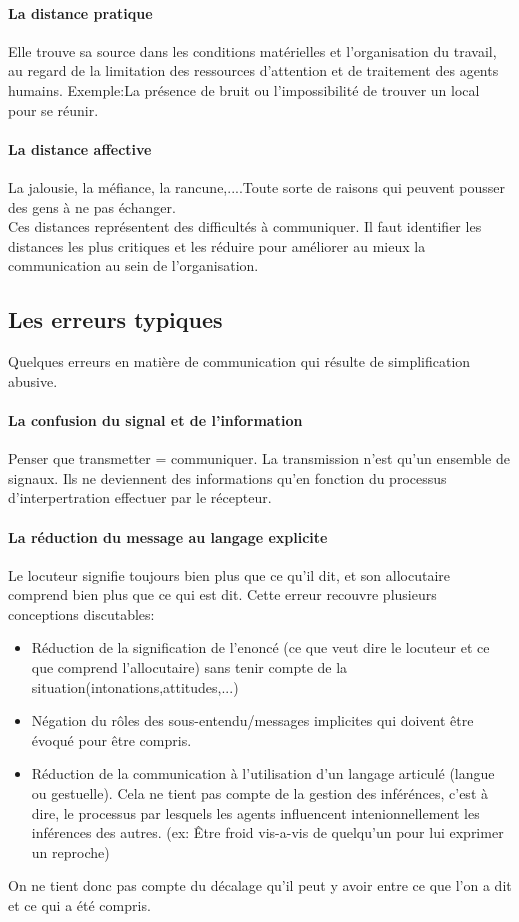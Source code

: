 \documentclass[11pt]{article} %
\begin{document}
		\paragraph{La distance pratique} Elle trouve sa source dans les conditions matérielles et l'organisation
		du travail, au regard de la limitation des ressources d'attention et de traitement des agents humains. 
		Exemple:La présence de bruit ou l'impossibilité de trouver un local pour se réunir.
		\paragraph{La distance affective} La jalousie, la méfiance, la rancune,....Toute sorte de raisons qui 
		peuvent pousser des gens à ne pas échanger.\\
		Ces distances représentent des difficultés à communiquer. Il faut identifier les distances les plus 
		critiques et les réduire pour améliorer au mieux la communication au sein de l'organisation.


	\subsection{Les erreurs typiques}
		Quelques erreurs en matière de communication qui résulte de simplification abusive.
		\paragraph{La confusion du signal et de l'information} Penser que transmetter = communiquer.  La transmission n'est qu'un ensemble de signaux. Ils ne deviennent des informations qu'en fonction du processus d'interpertration effectuer par 
		le récepteur.

		\paragraph{La réduction du message au langage explicite}  Le locuteur signifie toujours bien plus que ce qu'il dit, et son allocutaire comprend bien plus que ce qui est dit. Cette erreur recouvre plusieurs conceptions discutables:
		\begin{itemize}
			\item Réduction de la signification de l'enoncé (ce que veut dire le locuteur et ce que comprend 
			l'allocutaire) sans tenir compte de la situation(intonations,attitudes,...)
			\item Négation du rôles des sous-entendu/messages implicites qui doivent être évoqué pour
		être compris.
			\item Réduction de la communication à l'utilisation d'un langage articulé (langue ou gestuelle). 
			Cela ne tient pas compte de la gestion des inférénces, c'est à dire, le processus par lesquels
			les agents influencent intenionnellement les inférences des autres. (ex: Être froid vis-a-vis de 
			quelqu'un pour lui exprimer un reproche) 
		\end{itemize} 
		On ne tient donc pas compte du décalage qu'il peut y avoir entre ce que l'on a dit et ce qui a été 
		compris.
\end{document}
